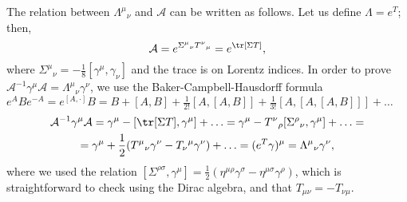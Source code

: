 \documentclass[a4paper,12pt]{book}
\begin{document}
The relation between $\Lambda^\mu{}_\nu$ and $\mathcal A$ can be written as follows. Let us define $\Lambda=e^T$; then,
\[\mathcal A=e^{\Sigma^\mu{}_\nu T^\nu{}_\mu}=e^{\tr[\Sigma T]},\]
where $\Sigma^\mu{}_\nu=-\frac{1}{8}[\gamma^\mu,\gamma_\nu]$ and the trace is on Lorentz indices. In order to prove $\mathcal A^{-1}\gamma^\mu\mathcal A=\Lambda^\mu{}_\nu\gamma^\nu$, we use the Baker-Campbell-Hausdorff formula $e^ABe^{-A}=e^{[A,\cdot]}B=B+[A,B]+\frac{1}{2!}[A,[A,B]]+\frac{1}{3!}[A,[A,[A,B]]]+\ldots$
\begin{multline*}
\mathcal A^{-1}\gamma^\mu\mathcal A=\gamma^\mu-[\tr[\Sigma T],\gamma^\mu]+\ldots=\gamma^\mu-T^\nu{}_\rho[\Sigma^\rho{}_\nu,\gamma^\mu]+\ldots=\\
=\gamma^\mu+\frac{1}{2}(T^\mu{}_\nu\gamma^\nu-T_\nu{}^\mu\gamma^\nu)+\ldots=(e^T\gamma)^\mu=\Lambda^\mu{}_\nu\gamma^\nu,
\end{multline*}
where we used the relation $[\Sigma^{\rho\sigma},\gamma^\mu]=\frac{1}{2}(\eta^{\mu\rho}\gamma^\sigma-\eta^{\mu\sigma}\gamma^\rho)$, which is straightforward to check using the Dirac algebra, and that $T_{\mu\nu}=-T_{\nu\mu}$.
\end{document}
